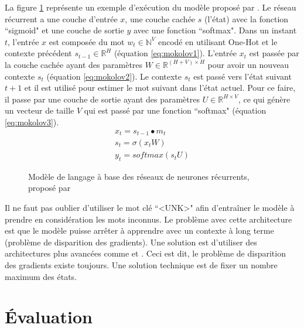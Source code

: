\documentclass{KodeBook}
\begin{document}
La figure \ref{fig:mokolov} représente un exemple d'exécution du modèle proposé par \citet{2010-mokolov-al}.
Le réseau récurrent a une couche d'entrée $x$, une couche cachée $s$ (l'état) avec la fonction ``sigmoid" et une couche de sortie $y$ avec une fonction ``softmax".
Dans un instant $t$, l'entrée $x$ est composée du mot $w_t \in \mathbb{N}^{V}$ encodé en utilisant One-Hot et le contexte précédent $s_{t-1} \in \mathbb{R}^{H}$ (équation \ref{eq:mokolov1}). 
L'entrée $x_t$ est passée par la couche cachée ayant des paramètres $W \in \mathbb{R}^{(H+V)\times H}$ pour avoir un nouveau contexte $s_t$ (équation \ref{eq:mokolov2}). 
Le contexte $s_t$ est passé vers l'état suivant $t+1$ et il est utilisé pour estimer le mot suivant dans l'état actuel.
Pour ce faire, il passe par une couche de sortie ayant des paramètres $U \in \mathbb{R}^{H\times V}$, ce qui génère un vecteur de taille $V$ qui est passé par une fonction ``softmax" (équation \ref{eq:mokolov3}).
%
\begin{align}
	x_t = s_{t-1} \bullet m_t \label{eq:mokolov1}\\
	s_t = \sigma(x_t W) \label{eq:mokolov2}\\
	y_t = softmax(s_t U) \label{eq:mokolov3}
\end{align}

\begin{figure}[ht]
	\centering
	\caption[Modèle de langage à base des réseaux de neurones récurrents]{Modèle de langage à base des réseaux de neurones récurrents, proposé par \cite{2010-mokolov-al}\label{fig:mokolov}}
\end{figure}

Il ne faut pas oublier d'utiliser le mot clé ``\textless UNK\textgreater" afin d'entraîner le modèle à prendre en considération les mots inconnus. 
Le problème avec cette architecture est que le modèle puisse arrêter à apprendre avec un contexte à long terme (problème de disparition des gradients).
Une solution est d'utiliser des architectures plus avancées comme  et . 
Ceci est dit, le problème de disparition des gradients existe toujours. 
Une solution technique est de fixer un nombre maximum des états.

\section{Évaluation}
\end{document}
